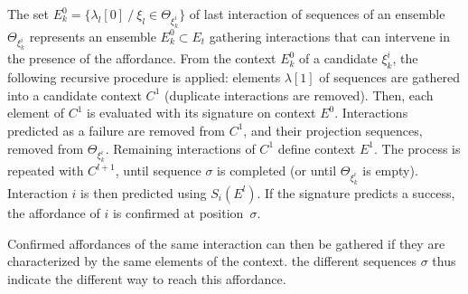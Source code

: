 \documentclass[conference]{IEEEtran}
\begin{document}
The set $E_k^0=\{\lambda_l[0] ~/~\xi_l \in \Theta_{\xi_k^i}\}$ of last interaction of sequences of an ensemble $\Theta_{\xi_k^i}$ represents an ensemble $E_k^0 \subset E_t$ gathering interactions that can intervene in the presence of the affordance.
From the context $E_k^0$ of a candidate $\xi_k^i$, the following recursive procedure is applied: elements $\lambda[1]$ of sequences are gathered into a candidate context $C^1$ (duplicate interactions are removed). Then, each element of $C^1$ is evaluated with its signature on context $E^0$. Interactions predicted as a failure are removed from $C^1$, and their projection sequences, removed from $\Theta_{\xi_k^i}$. Remaining interactions of $C^1$ define context $E^1$. The process is repeated with $C^{l+1}$, until sequence $\sigma$ is completed (or until $\Theta_{\xi_k^i}$ is empty). Interaction $i$ is then predicted using $S_i(E^l)$. If the signature predicts a success, the affordance of $i$ is confirmed at position~$\sigma$.

Confirmed affordances of the same interaction can then be gathered if they are characterized by the same elements of the context. the different sequences $\sigma$ thus indicate the different way to reach this affordance.




\end{document}
